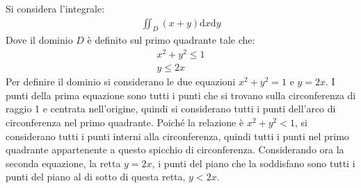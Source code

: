 \documentclass{article}
\newcommand{\df}{\mathrm{d}}
\numberwithin{equation}{subsection}
\begin{document}
Si considera l'integrale:
\begin{gather*}
    \iint_D(x+y)\df x \df y
\end{gather*}
Dove il dominio $D$ è definito sul primo quadrante tale che:
\begin{gather*}
    x^2+y^2\leq1\\
    y\leq2x
\end{gather*}
Per definire il dominio si considerano le due equazioni $x^2+y^2=1$ e $y=2x$. I punti della prima equazione sono tutti i punti che si trovano sulla circonferenza di raggio 1 e centrata nell'origine, quindi si considerano tutti i punti dell'arco di circonferenza nel primo quadrante. Poiché la relazione è $x^2+y^2<1$, si considerano tutti i punti interni alla circonferenza, quindi tutti i punti nel primo quadrante appartenente a questo spicchio di circonferenza. 
Considerando ora la seconda equazione, la retta $y=2x$, i punti del piano che la soddisfano sono tutti i punti del piano al di sotto di questa retta, $y<2x$. 
\end{document}
